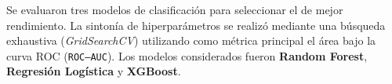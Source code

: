 \documentclass[12pt]{article}
\begin{document}
%
%
%
%
%
%
%
%
%
%
%
%

Se evaluaron tres modelos de clasificación para seleccionar el de mejor rendimiento.
La sintonía de hiperparámetros se realizó mediante una búsqueda exhaustiva (\textit{GridSearchCV}) utilizando como métrica principal el área bajo la curva ROC (\texttt{ROC–AUC}).
Los modelos considerados fueron \textbf{Random Forest}, \textbf{Regresión Logística} y \textbf{XGBoost}.
\end{document}
